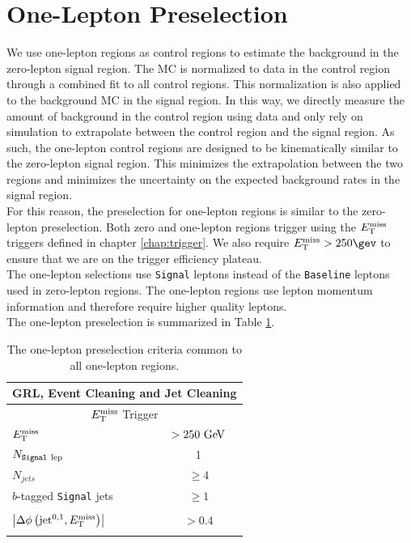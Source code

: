 \section{One-Lepton Preselection}

\indent We use one-lepton regions as control regions to estimate the background in the zero-lepton signal region.  The MC is normalized to data in the control region through a combined fit to all control regions. This normalization is also applied to the background MC in the signal region.  In this way, we directly measure the amount of background in the control region using data and only rely on simulation to extrapolate between the control region and the signal region.  As such, the one-lepton control regions are designed to be kinematically similar to the zero-lepton signal region.  This minimizes the extrapolation between the two regions and minimizes the uncertainty on the expected background rates in the signal region. \\

\indent For this reason, the preselection for one-lepton regions is similar to the zero-lepton preselection.  Both zero and one-lepton regions trigger using the $E_{\mathrm{T}}^{\mathrm{miss}}$ triggers defined in chapter \ref{chap:trigger}.  We also require $\met > 250 \gev$ to ensure that we are on the trigger efficiency plateau.  \\

\indent The one-lepton selections use {\tt Signal} leptons instead of the {\tt Baseline} leptons used in zero-lepton regions.  The one-lepton regions use lepton momentum information and therefore require higher quality leptons. \\

\indent The one-lepton preselection is summarized in Table \ref{tab:1Lcommon}. \\

\begin{table}[h!]
  \caption{ The one-lepton preselection criteria common to all one-lepton regions.}
  \label{tab:1Lcommon}
  \setlength{\tabcolsep}{0.0pc}
  \begin{center}
    \begin{tabular}{lc} \hline\hline
      \multicolumn{2}{c}{GRL, Event Cleaning and Jet Cleaning} \\ \hline
      \multicolumn{2}{c}{$E_{\mathrm{T}}^{\mathrm{miss}}$ Trigger} \\ \hline
      $E_{\mathrm{T}}^{\mathrm{miss}}$ & $> 250\GeV$ \\ 
      $N_{\rm{{\tt Signal}~lep}}$ & 1 \\
    $N_{jets}$ & $\ge 4$ \\ 
      $b$-tagged {\tt Signal} jets & $\ge1$ \\ 
                   & \\ [-2.5ex] 
      $\left|\Delta\phi\left(\mathrm{jet}^{0,1},E_{\mathrm{T}}^{\mathrm{miss}}\right)\right|$ & $> 0.4$ \\
             & \\ [-2.5ex] \hline
    \end{tabular}
  \end{center}
\end{table}

